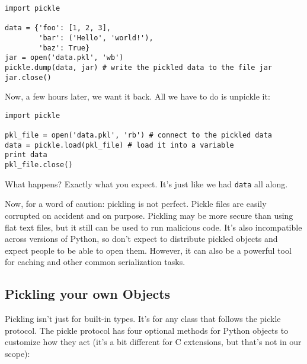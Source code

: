 \documentclass[a4paper,11pt]{article}
\newcommand{\code}[1]{\texttt{#1}}
\begin{document}
\begin{lstlisting}
import pickle

data = {'foo': [1, 2, 3],
        'bar': ('Hello', 'world!'),
        'baz': True}
jar = open('data.pkl', 'wb')
pickle.dump(data, jar) # write the pickled data to the file jar
jar.close()
\end{lstlisting}

\noindent
Now, a few hours later, we want it back. All we have to do is unpickle it:

\begin{lstlisting}
import pickle

pkl_file = open('data.pkl', 'rb') # connect to the pickled data
data = pickle.load(pkl_file) # load it into a variable
print data
pkl_file.close()
\end{lstlisting}

\noindent
What happens? Exactly what you expect. It's just like we had \code{data} all along.

Now, for a word of caution: pickling is not perfect. Pickle files are easily corrupted on accident and on purpose. Pickling may be more secure than using flat text files, but it still can be used to run malicious code. It's also incompatible across versions of Python, so don't expect to distribute pickled objects and expect people to be able to open them. However, it can also be a powerful tool for caching and other common serialization tasks.

\subsection{Pickling your own Objects}

Pickling isn't just for built-in types. It's for any class that follows the pickle protocol. The pickle protocol has four optional methods for Python objects to customize how they act (it's a bit different for C extensions, but that's not in our scope):
\end{document}
